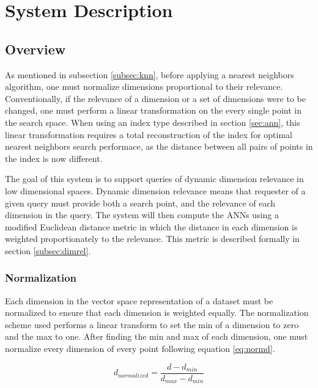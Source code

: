 \chapter{System Description} %

\label{sysdes} %


\section{Overview}
\label{sect:sysdesover}

As mentioned in subsection \ref{subsec:knn}, before applying a nearest neighbors algorithm, one must normalize dimensions proportional to their relevance.  Conventionally, if the relevance of a dimension or a set of dimensions were to be changed, one must perform a linear transformation on the every single point in the search space.  When using an index type described in section \ref{sec:ann}, this linear transformation requires a total reconstruction of the index for optimal nearest neighbors search performace, as the distance between all pairs of points in the index is now different.

The goal of this system is to support queries of dynamic dimension relevance in low dimensional spaces.  Dynamic dimension relevance means that requester of a given query must provide both a search point, and the relevance of each dimension in the query.  The system will then compute the ANNs using a modified Euclidean distance metric in which the distance in each dimension is weighted proportionately to the relevance.  This metric is described formally in section \ref{subsec:dimrel}.

\subsection{Normalization}
\label{subsec:normalization}

Each dimension in the vector space representation of a dataset must be normalized to ensure that each dimension is weighted equally.  The normalization scheme used performs a linear transform to set the min of a dimension to zero and the max to one.  After finding the min and max of each dimension, one must normalize every dimension of every point following equation \ref{eq:normd}.

\begin{equation}
\label{eq:normd}
d_{normalized} = \dfrac{d-d_{min}}{ d_{max} - d_{min} }
\end{equation}

